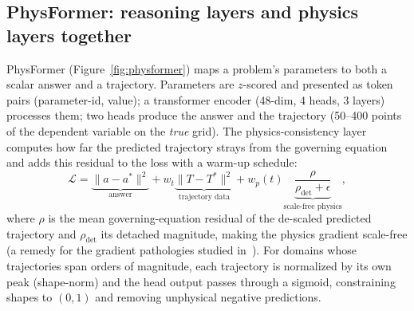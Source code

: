 \documentclass[conference,10pt]{IEEEtran}
\begin{document}
\subsection{PhysFormer: reasoning layers and physics layers together}
PhysFormer (Figure~\ref{fig:physformer}) maps a problem's parameters to both
a scalar answer and a trajectory. Parameters are $z$-scored and presented as
token pairs (parameter-id, value); a transformer encoder (48-dim, 4 heads, 3
layers) processes them; two heads produce the answer and the trajectory
(50--400 points of the dependent variable on the \emph{true} grid). The
physics-consistency layer computes how far the predicted trajectory strays
from the governing equation and adds this residual to the loss with a
warm-up schedule:
\begin{equation}
\mathcal{L} = \underbrace{\|a-a^{*}\|^{2}}_{\text{answer}}
+ w_{t}\underbrace{\|T-T^{*}\|^{2}}_{\text{trajectory data}}
+ w_{p}(t)\underbrace{\frac{\rho}{\rho_{\text{det}}+\epsilon}}_{\text{scale-free physics}},
\label{eq:loss}
\end{equation}
where $\rho$ is the mean governing-equation residual of the de-scaled
predicted trajectory and $\rho_{\text{det}}$ its detached magnitude, making
the physics gradient scale-free (a remedy for the gradient pathologies
studied in~\cite{wang2021}). For domains whose trajectories span orders of
magnitude, each trajectory is normalized by its own peak (shape-norm) and
the head output passes through a sigmoid, constraining shapes to $(0,1)$ and
removing unphysical negative predictions.
\end{document}

